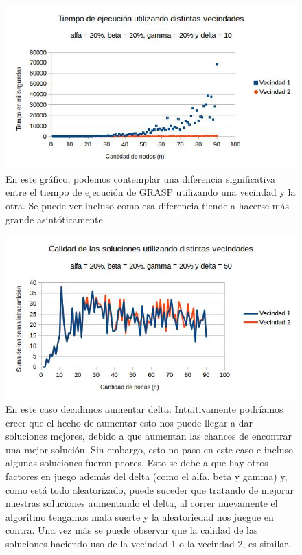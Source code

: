 \documentclass[a4paper]{article}
\begin{document}
\begin{figure}[H]
\centering
\includegraphics[scale=0.7]{20202010c.jpg}\caption{En este gráfico, podemos contemplar una diferencia significativa entre el tiempo de ejecución de GRASP utilizando una vecindad y la otra. Se puede ver incluso como esa diferencia tiende a hacerse más grande asintóticamente.}
\end{figure}

\begin{figure}[H]
\centering
\includegraphics[scale=0.7]{20202050.jpg}\caption{
\noindent En este caso decidimos aumentar delta. Intuitivamente podríamos creer que el hecho de aumentar esto nos puede llegar a dar soluciones mejores, debido a que aumentan las chances de encontrar una mejor solución. Sin embargo, esto no paso en este caso e incluso algunas soluciones fueron peores. Esto se debe a que hay otros factores en juego además del delta (como el alfa, beta y gamma) y, como está todo aleatorizado, puede suceder que tratando de mejorar nuestras soluciones aumentando el delta, al correr nuevamente el algoritmo tengamos mala suerte y la aleatoriedad nos juegue en contra. Una vez más se puede observar que la calidad de las soluciones haciendo uso de la vecindad 1 o la vecindad 2, es similar.}
\end{figure}
\end{document}
